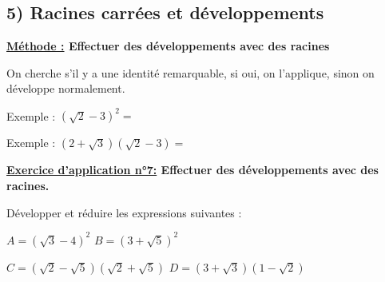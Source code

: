 \documentclass[12pt]{article}
\begin{document}
\vspace{10pt}
\subsection*{\hspace{1cm} 5) Racines carrées et développements}

\vspace{5pt}
{\color{RedOrange}\textbf{\underline{Méthode :} Effectuer des développements avec des racines}}

\vspace{5pt}
On cherche s'il y a une identité remarquable, si oui, on l'applique, sinon on développe normalement.

\vspace{20pt}
Exemple : $(\sqrt{2} - 3)^2 = $ 

\vspace{3cm}

Exemple : $(2 + \sqrt{3})(\sqrt{2} - 3) = $ 

\vspace{2cm}

\begin{mdframed}[
    linewidth=1pt,
    roundcorner=5pt,
    linecolor=RoyalBlue,
    innertopmargin=10pt,
    innerbottommargin=10pt
]
{\color{RoyalBlue}
\textbf{\underline{Exercice d'application n°7:} Effectuer des développements avec des racines.}}

\vspace{5pt}
Développer et réduire les expressions suivantes : 

\vspace{5pt}
\hspace{1cm}$A = (\sqrt{3} - 4)^2$ \hspace{3.15cm} $B = (3+\sqrt{5})^2$

\vspace{5pt}
\hspace{1cm}$C = (\sqrt{2} - \sqrt{5})(\sqrt{2}+ \sqrt{5})$ \hspace{1cm} $D = (3+\sqrt{3})(1-\sqrt{2})$


\vspace{0.5cm}
{\color{black!30}\dotfill}

\vspace{0.5cm}
{\color{black!30}\dotfill}

\vspace{0.5cm}
{\color{black!30}\dotfill}

\vspace{0.5cm}
{\color{black!30}\dotfill}

\vspace{0.5cm}
{\color{black!30}\dotfill}


\vspace{20pt}
\end{mdframed}
\end{document}
